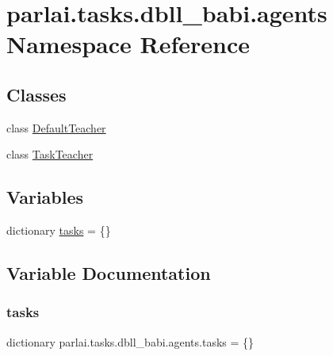 \hypertarget{namespaceparlai_1_1tasks_1_1dbll__babi_1_1agents}{}\section{parlai.\+tasks.\+dbll\+\_\+babi.\+agents Namespace Reference}
\label{namespaceparlai_1_1tasks_1_1dbll__babi_1_1agents}
\subsection*{Classes}
\begin{DoxyCompactItemize}
\item 
class \hyperlink{classparlai_1_1tasks_1_1dbll__babi_1_1agents_1_1DefaultTeacher}{Default\+Teacher}
\item 
class \hyperlink{classparlai_1_1tasks_1_1dbll__babi_1_1agents_1_1TaskTeacher}{Task\+Teacher}
\end{DoxyCompactItemize}
\subsection*{Variables}
\begin{DoxyCompactItemize}
\item 
dictionary \hyperlink{namespaceparlai_1_1tasks_1_1dbll__babi_1_1agents_a1be59136324d46b6b732a570bf37d040}{tasks} = \{\}
\end{DoxyCompactItemize}


\subsection{Variable Documentation}
\mbox{\label{namespaceparlai_1_1tasks_1_1dbll__babi_1_1agents_a1be59136324d46b6b732a570bf37d040}} 
\subsubsection{\texorpdfstring{tasks}{tasks}}
{\footnotesize\ttfamily dictionary parlai.\+tasks.\+dbll\+\_\+babi.\+agents.\+tasks = \{\}}

